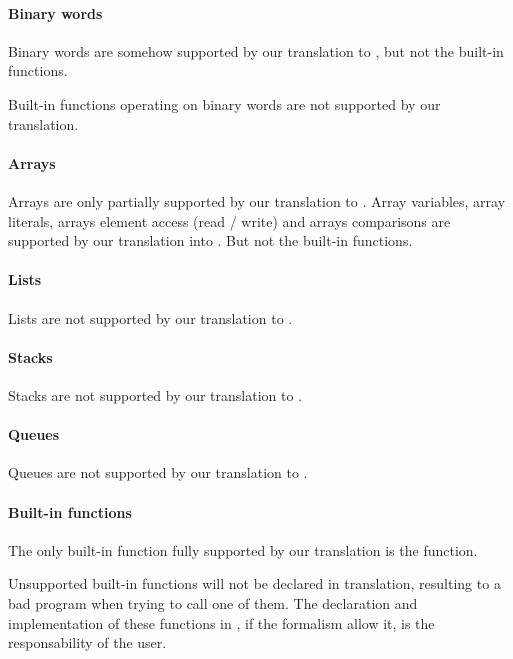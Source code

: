 \paragraph{Binary words}
Binary words are somehow supported by our translation to \jani{}, but not the built-in functions.

\begin{becareful}
	Built-in functions operating on binary words are not supported by our translation.
\end{becareful}

\paragraph{Arrays}

Arrays are only partially supported by our translation to \jani{}.
%
Array variables, array literals, arrays element access (read / write) and arrays comparisons are supported by our translation into \jani{}.
But not the built-in functions.

\paragraph{Lists}

Lists are not supported by our translation to \jani{}.

\paragraph{Stacks}

Stacks are not supported by our translation to \jani{}.

\paragraph{Queues}

Queues are not supported by our translation to \jani{}.

\paragraph{Built-in functions}

The only \imitator{} built-in function fully supported by our translation is the  function.

\begin{becareful}
	Unsupported \imitator{} built-in functions will not be declared in \jani{} translation, resulting to a bad program when trying to call one of them. The declaration and implementation of these functions in \jani{}, if the \jani{} formalism allow it, is the responsability of the user.
\end{becareful}

